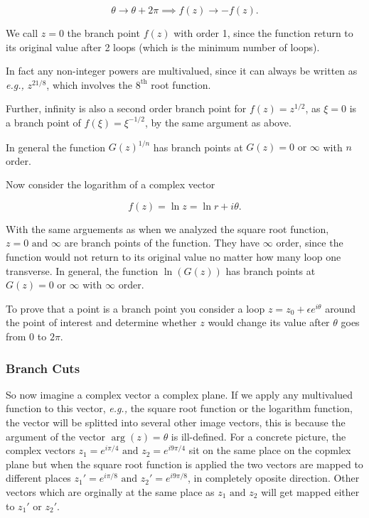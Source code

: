 \documentclass[english,a4paper,12pt]{report}
\begin{document}
\begin{equation}
    \theta \to \theta +2\pi \implies f(z) \to -f(z).
\end{equation}

We call \(z = 0\) the branch point \(f(z)\) with order 1, since the function return to its original value after 2 loops (which is the minimum number of loops).

In fact any non-integer powers are multivalued, since it can always be written as \textit{e.g.,} \(z^{21/8} \), which involves the \(8^{\text{th} } \) root function. 

Further, infinity is also a second order branch point for \(f(z) = z^{1 /2} \), as \(\xi =0\) is a branch point of \(f(\xi ) = \xi ^{- 1/2} \), by the same argument as above.  

In general the function \(G(z)^{1/n} \) has branch points at \(G(z) = 0 \text { or } \infty\) with \(n\) order.

Now consider the logarithm of a complex vector

\begin{equation}
    f(z) = \ln z = \ln r + i \theta .
\end{equation}

With the same arguements as when we analyzed the square root function, \(z = 0 \text { and } \infty\) are branch points of the function. They have \(\infty\) order, since the function would not return to its original value no matter how many loop one transverse. In general, the function \(\ln (G(z))\) has branch points at \(G(z) = 0 \text { or } \infty\) with \(\infty\) order.   

To prove that a point is a branch point you consider a loop \(z = z_0 + \epsilon e^{i \theta } \) around the point of interest and determine whether \(z\) would change its value after \(\theta \) goes from 0 to \(2\pi \).   

\subsubsection{Branch Cuts}

So now imagine a complex vector a complex plane. If we apply any multivalued function to this vector, \textit{e.g.,} the square root function or the logarithm function, the vector will be splitted into several other image vectors, this is because the argument of the vector \(\arg (z) = \theta \) is ill-defined. For a concrete picture, the complex vectors \(z_1 = e^{i \pi /4} \text { and } z_2 = e^{i 9\pi /4} \) sit on the same place on the copmlex plane but when the square root function is applied the two vectors are mapped to different places \(z_1 ' = e^{i \pi /8} \text { and } z_2 ' = e^{i 9 \pi /8} \), in completely oposite direction. Other vectors which are orginally at the same place as \(z_1 \text { and } z_2 \) will get mapped either to \(z_1 ' \text { or } z_2 '\).
\end{document}
